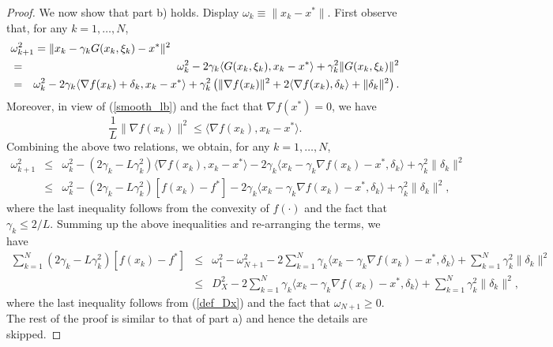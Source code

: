 \documentclass[final]{siamltex}
\newcommand{\beq}{\begin{equation}}
\newcommand{\eeq}{\end{equation}}
\newcommand{\beqa}{\begin{eqnarray}}
\newcommand{\eeqa}{\end{eqnarray}}
\newcommand{\beqas}{\begin{eqnarray*}}
\newcommand{\eeqas}{\end{eqnarray*}}
\newcommand{\nn}{\nonumber}
\def\eqnok#1{(\ref{#1})}
\newcommand{\bbe}{\mathbb{E}}
\def\w{\omega}
\begin{document}
\begin{proof}
We now show that part b) holds. Display $\w_k \equiv \|x_k - x^*\|$.
First observe that, for any $k = 1, \ldots, N$,
\beqas
\lefteqn{\w_{k+1}^2 = \|x_k - \gamma_k G(x_k, \xi_k) - x^*\|^2 }\\
&=& \w_k^2 - 2 \gamma_k \langle G(x_k, \xi_k), x_k - x^*\rangle
+ \gamma_k^2 \|G(x_k, \xi_k)\|^2 \\
&=& \w_k^2 - 2 \gamma_k \langle \nabla f(x_k) + \delta_k, x_k - x^*\rangle
+ \gamma_k^2 \left(\|\nabla f(x_k)\|^2 + 2\langle \nabla f(x_k), \delta_k \rangle
+ \|\delta_k\|^2 \right).
\eeqas
Moreover, in view of \eqnok{smooth_lb} and the fact that $\nabla f(x^*) = 0$, we have
\beq \label{basic_convex_rel}
\frac{1}{L} \|\nabla f(x_k)\|^2 \le  \langle \nabla f(x_k), x_k - x^*\rangle.
\eeq
Combining the above two relations, we obtain, for any $k = 1, \ldots, N$,
\beqas
\w_{k+1}^2 &\le& \w_k^2
- (2\gamma_k - L \gamma_k^2) \langle \nabla f(x_k), x_k - x^* \rangle
- 2\gamma_k \langle x_k - \gamma_k \nabla f(x_k) - x^*, \delta_k \rangle
+ \gamma_k^2 \|\delta_k\|^2\\
&\le& \w_k^2
- (2\gamma_k - L \gamma_k^2) [ f(x_k) - f^*]
- 2\gamma_k \langle x_k - \gamma_k \nabla f(x_k) - x^*, \delta_k \rangle
+ \gamma_k^2 \|\delta_k\|^2,
\eeqas
where the last inequality follows from the convexity of $f(\cdot)$
and the fact that $\gamma_k \le 2/L$.
Summing up the above inequalities and re-arranging the terms, we
have
\beqas
\sum_{k=1}^N(2\gamma_k - L \gamma_k^2) [ f(x_k) - f^*]
&\le& \w_1^2 - \w_{N+1}^2 -2 \sum_{k=1}^N \gamma_k \langle x_k -
\gamma_k \nabla f(x_k) - x^*, \delta_k \rangle + \sum_{k=1}^N \gamma_k^2 \|\delta_k\|^2\\
&\le& D_X^2 - 2 \sum_{k=1}^N \gamma_k \langle x_k -
\gamma_k \nabla f(x_k) - x^*, \delta_k \rangle + \sum_{k=1}^N \gamma_k^2 \|\delta_k\|^2,
\eeqas
where the last inequality follows from \eqnok{def_Dx} and the fact that
$\w_{N+1} \ge 0$. The rest of the proof is similar to that of part a) and hence the details
are skipped.



\end{proof}
\end{document}
